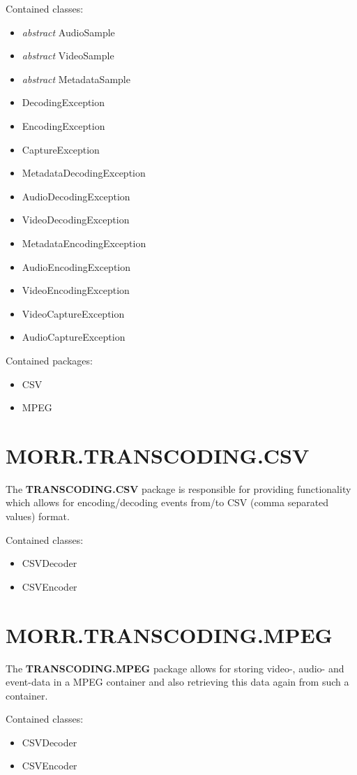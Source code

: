 Contained classes:
\begin{itemize}
\item \textit{abstract} AudioSample
\item \textit{abstract} VideoSample
\item \textit{abstract} MetadataSample
\item DecodingException
\item EncodingException
\item CaptureException
\item MetadataDecodingException
\item AudioDecodingException
\item VideoDecodingException
\item MetadataEncodingException
\item AudioEncodingException
\item VideoEncodingException
\item VideoCaptureException
\item AudioCaptureException
\end{itemize}

Contained packages:
\begin{itemize}
\item CSV
\item MPEG
\end{itemize}

\section*{MORR.TRANSCODING.CSV}
The \textbf{TRANSCODING.CSV} package is responsible for providing functionality which allows for encoding/decoding events from/to CSV (comma separated values) format.

Contained classes:
\begin{itemize}
\item CSVDecoder
\item CSVEncoder
\end{itemize}

\section*{MORR.TRANSCODING.MPEG}
The \textbf{TRANSCODING.MPEG} package allows for storing video-, audio- and event-data in a MPEG container and also retrieving this data again from such a container.

Contained classes:
\begin{itemize}
\item CSVDecoder
\item CSVEncoder
\end{itemize}

